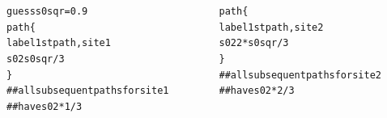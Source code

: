 \documentclass[10pt, xcolor=x11names, compress]{beamer}
\begin{document}
\begin{frame}[fragile]

  \begin{columns}
    \begin{column}{0.5\linewidth}
      \scriptsize
      \begin{alltt}
  {\color{guessp}guess}  s0sqr = 0.9
  {\color{Purple4}path} \{
     {\color{Gold4}label}   1st path, site 1
     {\color{Gold4}s02}     s0sqr / 3
   \}
  {\color{Blue4}## all subsequent paths for site 1
  ## have} {\color{Gold4}s02}{\color{Blue4} * 1/3}
      \end{alltt}      
    \end{column}
    \begin{column}{0.5\linewidth}
      \scriptsize
      \begin{alltt}

  {\color{Purple4}path} \{
     {\color{Gold4}label}   1st path, site 2
     {\color{Gold4}s02}     2 * s0sqr / 3
   \}
  {\color{Blue4}## all subsequent paths for site 2
  ## have} {\color{Gold4}s02}{\color{Blue4} * 2/3}
      \end{alltt}      
    \end{column}
  \end{columns}
\end{frame}
\end{document}
